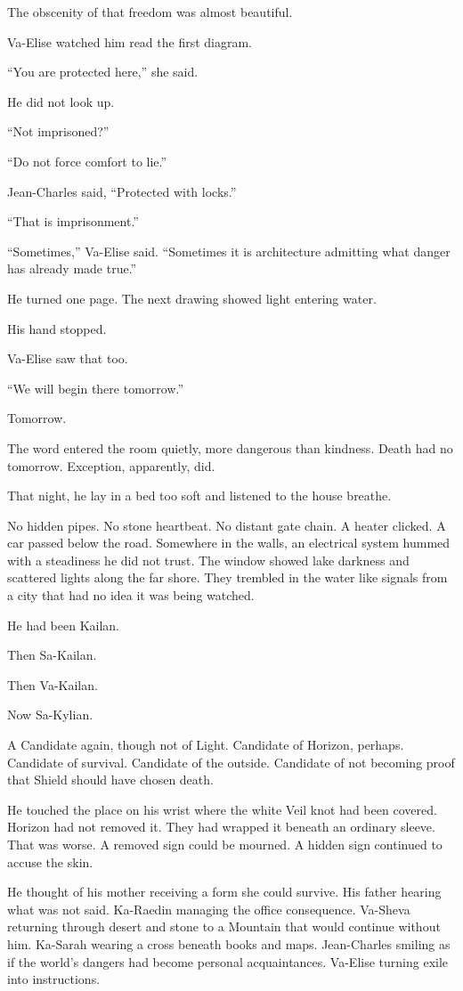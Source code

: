 The obscenity of that freedom was almost beautiful.\par
Va-Elise watched him read the first diagram.\par
“You are protected here,” she said.\par
He did not look up.\par
“Not imprisoned?”\par
“Do not force comfort to lie.”\par
Jean-Charles said, “Protected with locks.”\par
“That is imprisonment.”\par
“Sometimes,” Va-Elise said. “Sometimes it is architecture admitting what danger has already made true.”\par
He turned one page. The next drawing showed light entering water.\par
His hand stopped.\par
Va-Elise saw that too.\par
“We will begin there tomorrow.”\par
Tomorrow.\par
The word entered the room quietly, more dangerous than kindness. Death had no tomorrow. Exception, apparently, did.\par
That night, he lay in a bed too soft and listened to the house breathe.\par
No hidden pipes. No stone heartbeat. No distant gate chain. A heater clicked. A car passed below the road. Somewhere in the walls, an electrical system hummed with a steadiness he did not trust. The window showed lake darkness and scattered lights along the far shore. They trembled in the water like signals from a city that had no idea it was being watched.\par
He had been Kailan.\par
Then Sa-Kailan.\par
Then Va-Kailan.\par
Now Sa-Kylian.\par
A Candidate again, though not of Light. Candidate of Horizon, perhaps. Candidate of survival. Candidate of the outside. Candidate of not becoming proof that Shield should have chosen death.\par
He touched the place on his wrist where the white Veil knot had been covered. Horizon had not removed it. They had wrapped it beneath an ordinary sleeve. That was worse. A removed sign could be mourned. A hidden sign continued to accuse the skin.\par
He thought of his mother receiving a form she could survive. His father hearing what was not said. Ka-Raedin managing the office consequence. Va-Sheva returning through desert and stone to a Mountain that would continue without him. Ka-Sarah wearing a cross beneath books and maps. Jean-Charles smiling as if the world’s dangers had become personal acquaintances. Va-Elise turning exile into instructions.\par
